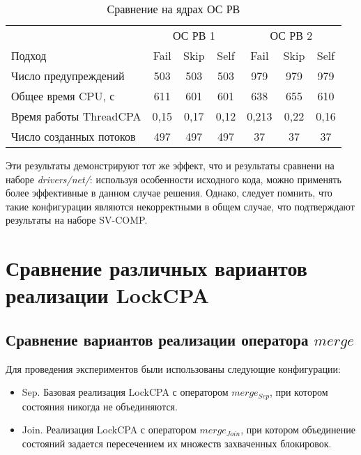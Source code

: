   \begin{table}[h]\footnotesize \centering
    \caption{Сравнение на ядрах ОС РВ}
  	\label{table-os-thread-create}
    \begin{tabular}{ | l | c | c | c | c | c | c |}
      \hline
      						& 		\multicolumn{3}{|c|}{ОС РВ 1} 		& \multicolumn{3}{|c|}{ОС РВ 2} \\
      Подход         				& Fail 		& Skip 		& Self 		& Fail 		& Skip 		& Self  \\ \hline
      Число предупреждений			& 503   	& 503  		& 503  		& 979   	& 979   	& 979   \\ 
  	  Общее время CPU, с 			& 611 		& 601 		& 601  		& 638   	& 655  		& 610   \\ 
\hspace{0.5cm} Время работы ThreadCPA & 0,15	& 0,17 		& 0,12 		& 0,213   	& 0,22 		& 0,16   \\ \hline
      Число созданных потоков  		& 497    	& 497    	& 497   	& 37   		& 37  		& 37   \\ 
      \hline
    \end{tabular}
  \end{table}

Эти результаты демонстрируют тот же эффект, что и результаты  сравнени на наборе \textit{drivers/net/}: используя особенности исходного кода, можно применять более эффективные в данном случае решения.
Однако, следует помнить, что такие конфигурации являются некорректными в общем случае, что подтверждают результаты на наборе SV-COMP.

\section{Сравнение различных вариантов реализации LockCPA}

\subsection{Сравнение вариантов реализации оператора $merge$}

Для проведения экспериментов были использованы следующие конфигурации:

\begin{itemize}
\item Sep. Базовая реализация LockCPA с оператором $merge_{Sep}$, при котором состояния никогда не объединяются.
\item Join. Реализация LockCPA с оператором $merge_{Join}$, при котором объединение состояний задается пересечением их множеств захваченных блокировок.
\end{itemize}

